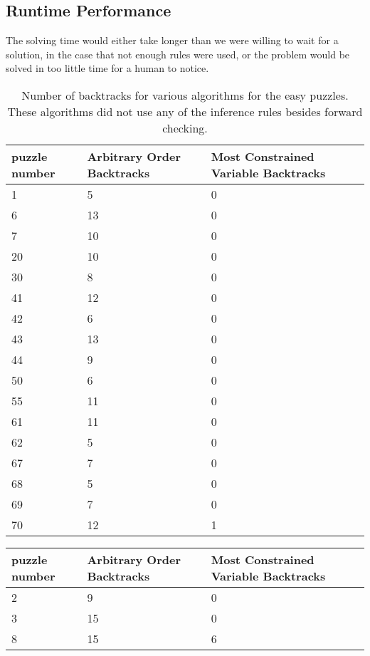 \documentclass{article}
\begin{document}
\begin{algorithm}
 \subsection{Runtime Performance}
 The solving time would either take longer than we were willing to wait for a solution, in the case that not enough rules were used, or the problem would be solved in too little time for a human to notice. 
\begin{table}[h]\centering
  \begin{tabular}{lll}
    \toprule
    puzzle number& Arbitrary Order Backtracks & Most Constrained Variable Backtracks\\
    \midrule
    1& 5 & 0\\
    \midrule
    6& 13&0\\
    \midrule
    7& 10&0\\
    \midrule
    20&10&0\\
    \midrule
    30& 8&0\\
    \midrule
    41& 12& 0\\
    \midrule
    42& 6& 0\\
    \midrule
    43& 13&0\\
    \midrule
    44&9&0\\
    \midrule
    50&6&0\\
    \midrule
    55 &11 &0\\
    \midrule
    61& 11 &0\\
    \midrule
    62 &5&0\\
    \midrule
    67&7&0\\
    \midrule
    68& 5&0\\
    \midrule
    69&7&0\\
    \midrule
    70& 12 &1\\
    \bottomrule
  \end{tabular}
  \caption{Number of backtracks for various algorithms for the easy puzzles. These algorithms did not use any of the inference rules besides forward checking. }
  \label{tab:resultsEasy}
\end{table}
\begin{table}[h]
  \centering
  \begin{tabular}{lll}
   \toprule
    puzzle number& Arbitrary Order Backtracks & Most Constrained Variable Backtracks\\
    \midrule
    2&9&0\\
    \midrule
    3&15&0\\
    \midrule
    8&15&6\\
    \midrule

\end{tabular}
\end{table}
\end{algorithm}
\end{document}
